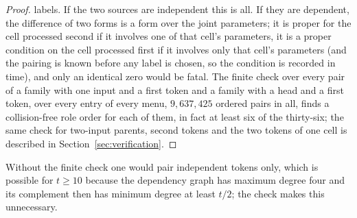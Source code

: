 \documentclass[11pt,a4paper]{article}
\theoremstyle{plain}
\theoremstyle{definition}
\theoremstyle{remark}
\begin{document}
\begin{proof}
labels.  If the two sources are independent this is all.  If they are
dependent, the difference of two forms is a form over the joint parameters; it
is proper for the cell processed second if it involves one of that cell's
parameters, it is a proper condition on the cell processed first if it
involves only that cell's parameters (and the pairing is known before any
label is chosen, so the condition is recorded in time), and only an identical
zero would be fatal.  The finite check over every pair of a family with one
input and a first token and a family with a head and a first token, over every
entry of every menu, $9{,}637{,}425$ ordered pairs in all, finds a
collision-free role order for each of them, in fact at least six of the
thirty-six; the same check for two-input parents,
second tokens and the two tokens of one cell is described in
Section~\ref{sec:verification}.
\end{proof}

Without the finite check one would pair independent tokens only, which is
possible for $t\ge 10$ because the dependency graph has maximum degree four
and its complement then has minimum degree at least $t/2$; the check makes
this unnecessary.
\end{document}
